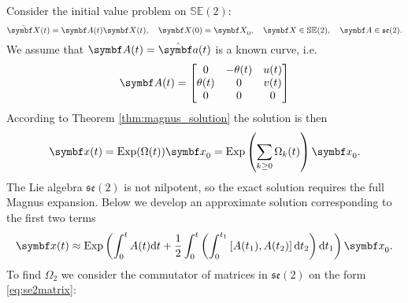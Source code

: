 Consider the initial value problem on $\mathbb{SE}(2)$:
\begin{equation}
  \dot \X(t) = \A(t) \X(t), \quad \X(0) = \X_0, \quad \X \in \mathbb{SE}(2), \quad \A \in \mathfrak{se}(2).
\end{equation}
We assume that $\A(t) = \hat \a(t)$ is a known curve, i.e.
\begin{equation}
  \label{eq:se2matrix}
  \A(t) = \begin{bmatrix}
    0 & -\theta(t) & u(t) \\ \theta(t) & 0 & v(t) \\ 0 & 0 & 0
  \end{bmatrix}
\end{equation}
According to Theorem \ref{thm:magnus_solution} the solution is then
\begin{equation}
  \x(t) = \Exp(\Omega(t)) \x_0 = \Exp \left( \sum_{k \geq 0} \Omega_k(t) \right) \x_0.
\end{equation}
The Lie algebra $\mathfrak{se}(2)$ is not nilpotent, so the exact solution requires the full Magnus expansion. Below we develop an approximate solution corresponding to the first two terms
\begin{equation}
  \x(t) \approx \Exp \left( \int_0^t A(t) \mathrm{d} t + \frac{1}{2} \int_{0}^t \left(\int_{0}^{t_1} \left[ A(t_1), A(t_2) \right] \mathrm{d} t_2 \right) \mathrm{d} t_1 \right) \x_0.
\end{equation}
To find $\Omega_2$ we consider the commutator of matrices in $\mathfrak{se}(2)$ on the form \eqref{eq:se2matrix}:
